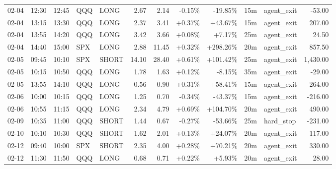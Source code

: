 \documentclass[11pt,a4paper]{article}
\begin{document}
\begin{center}
\begin{longtable}{>{\color{txtmain}}l l l l l r r r r r >{\color{txtmain}}l r}
02-04 & 12:30 & 12:45 & QQQ & LONG & 2.67 & 2.14 & \textcolor{lossred}{-0.15\%} & \textcolor{lossred}{-19.85\%} & 15m & agent\_exit & \textcolor{lossred}{-53.00} \\
02-04 & 13:15 & 13:30 & QQQ & LONG & 2.37 & 3.41 & \textcolor{wingreen}{+0.37\%} & \textcolor{wingreen}{+43.67\%} & 15m & agent\_exit & \textcolor{wingreen}{207.00} \\
02-04 & 13:55 & 14:20 & QQQ & LONG & 3.42 & 3.66 & \textcolor{wingreen}{+0.08\%} & \textcolor{wingreen}{+7.17\%} & 25m & agent\_exit & \textcolor{wingreen}{24.50} \\
02-04 & 14:40 & 15:00 & SPX & LONG & 2.88 & 11.45 & \textcolor{wingreen}{+0.32\%} & \textcolor{wingreen}{+298.26\%} & 20m & agent\_exit & \textcolor{wingreen}{857.50} \\
02-05 & 09:45 & 10:10 & SPX & SHORT & 14.10 & 28.40 & \textcolor{wingreen}{+0.61\%} & \textcolor{wingreen}{+101.42\%} & 25m & agent\_exit & \textcolor{wingreen}{1,430.00} \\
02-05 & 10:15 & 10:50 & QQQ & LONG & 1.78 & 1.63 & \textcolor{wingreen}{+0.12\%} & \textcolor{lossred}{-8.15\%} & 35m & agent\_exit & \textcolor{lossred}{-29.00} \\
02-05 & 13:55 & 14:10 & QQQ & LONG & 0.56 & 0.90 & \textcolor{wingreen}{+0.31\%} & \textcolor{wingreen}{+58.41\%} & 15m & agent\_exit & \textcolor{wingreen}{264.00} \\
02-06 & 10:00 & 10:15 & QQQ & LONG & 1.25 & 0.70 & \textcolor{lossred}{-0.34\%} & \textcolor{lossred}{-43.37\%} & 15m & agent\_exit & \textcolor{lossred}{-216.00} \\
02-06 & 10:55 & 11:15 & QQQ & LONG & 2.34 & 4.79 & \textcolor{wingreen}{+0.69\%} & \textcolor{wingreen}{+104.70\%} & 20m & agent\_exit & \textcolor{wingreen}{490.00} \\
02-09 & 10:35 & 11:00 & QQQ & SHORT & 1.44 & 0.67 & \textcolor{lossred}{-0.27\%} & \textcolor{lossred}{-53.66\%} & 25m & hard\_stop & \textcolor{lossred}{-231.00} \\
02-10 & 10:10 & 10:30 & QQQ & SHORT & 1.62 & 2.01 & \textcolor{wingreen}{+0.13\%} & \textcolor{wingreen}{+24.07\%} & 20m & agent\_exit & \textcolor{wingreen}{117.00} \\
02-12 & 09:40 & 10:00 & SPX & SHORT & 2.35 & 4.00 & \textcolor{wingreen}{+0.28\%} & \textcolor{wingreen}{+70.21\%} & 20m & agent\_exit & \textcolor{wingreen}{330.00} \\
02-12 & 11:30 & 11:50 & QQQ & LONG & 0.68 & 0.71 & \textcolor{wingreen}{+0.22\%} & \textcolor{wingreen}{+5.93\%} & 20m & agent\_exit & \textcolor{wingreen}{28.00} \\

\end{longtable}
\end{center}
\end{document}
